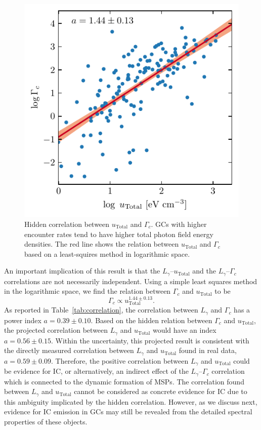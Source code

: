 \documentclass[doublespace,nopageskip]{VTthesis} %
\begin{document}
\begin{figure}
    \centering
    \includegraphics[width=\columnwidth]{Figures/Globular/hidden.pdf}
    \caption{Hidden correlation between $u_\mathrm{Total}$ and $\Gamma_c$. GCs with higher encounter rates tend to have higher total photon field energy densities. The red line shows the relation between $u_\mathrm{Total}$ and $\Gamma_c$ based on a least-squires method in logarithmic space.}
    \label{fig:hidden_0}
\end{figure}

An important implication of this result is that the $L_\gamma$--$u_\mathrm{Total}$ and the $L_\gamma$--$\Gamma_c$ correlations are not necessarily independent. Using a simple least squares method in the logarithmic space, we find the relation between $\Gamma_c$ and $u_\mathrm{Total}$ to be
\begin{equation}
    \Gamma_c \propto u_\mathrm{Total}^{1.44 \pm 0.13}.
\end{equation}
As reported in Table~\ref{tab:correlation}, the correlation between $L_\gamma$ and $\Gamma_c$ has a power index $a=0.39 \pm 0.10$. Based on the hidden relation between $\Gamma_c$ and $u_\mathrm{Total}$, the projected correlation between $L_\gamma$ and $u_\mathrm{Total}$ would have an index $a = 0.56 \pm 0.15$. Within the uncertainty, this projected result is consistent with the directly measured correlation between $L_\gamma$ and $u_\mathrm{Total}$ found in real data, $a = 0.59 \pm 0.09$. Therefore, the positive correlation between $L_\gamma$ and $u_\mathrm{Total}$ could be evidence for IC, or alternatively, an indirect effect of the $L_\gamma$--$\Gamma_c$ correlation which is connected to the dynamic formation of MSPs. The correlation found between $L_\gamma$ and $u_\mathrm{Total}$ cannot be considered as concrete evidence for IC due to this ambiguity implicated by the hidden correlation. However, as we discuss next, evidence for IC emission in GCs may still be revealed from the detailed spectral properties of these objects.
\end{document}
